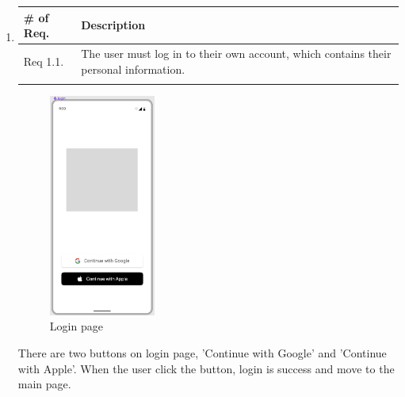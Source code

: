 \begin{enumerate}[label=\arabic*.]
\begin{enumerate}[label*={\arabic*.},ref=\theenumi.\arabic*]
        \item
            \begin{table}[H]
            \center
                \begin{tabular}{m{1.4cm} m{5.5cm}}
                \toprule
                \# of Req. & Description\\
                \midrule
                Req 1.1. & The user must log in to their own account, which contains their personal information.\\\\
                \bottomrule
                \end{tabular}
            \end{table}
            
            \begin{center}
                \begin{figure}[ht]
                    \begin{center}
                    \includegraphics[width=3.5cm]{imgs/specification/login_page.png}
                    \caption{Login page}
                    \renewcommand{\thefigure}{\thesubsection.\arabic{figure}}
                    \end{center}
                \end{figure}
            \end{center}
            There are two buttons on login page, 'Continue with Google' and 'Continue with Apple'. When the user click the button, login is success and move to the main page.\\\\
    \end{enumerate}
    

\end{enumerate}
